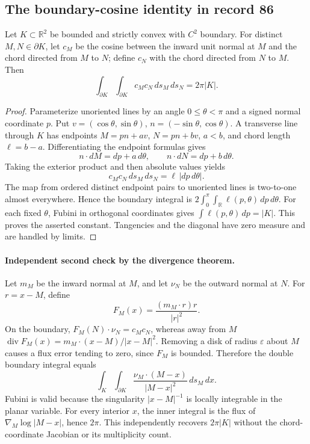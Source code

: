 \subsection{The boundary-cosine identity in record 86}

\begin{proposition}\ours
Let \(K\subset\mathbb R^2\) be bounded and strictly convex with \(C^2\)
boundary. For distinct \(M,N\in\partial K\), let \(c_M\) be the cosine between
the inward unit normal at \(M\) and the chord directed from \(M\) to \(N\);
define \(c_N\) with the chord directed from \(N\) to \(M\). Then
\[
 \int_{\partial K}\int_{\partial K}c_Mc_N\,ds_M\,ds_N=2\pi |K|.
\]
\end{proposition}

\begin{proof}
Parameterize unoriented lines by an angle \(0\leq\theta<\pi\) and a signed
normal coordinate \(p\). Put
\(v=(\cos\theta,\sin\theta)\), \(n=(-\sin\theta,\cos\theta)\).
A transverse line through \(K\) has endpoints
\(M=pn+av\), \(N=pn+bv\), \(a<b\), and chord length \(\ell=b-a\).
Differentiating the endpoint formulas gives
\[
 n\cdot dM=dp+a\,d\theta,\qquad n\cdot dN=dp+b\,d\theta.
\]
Taking the exterior product and then absolute values yields
\[
 c_Mc_N\,ds_M\,ds_N=\ell\,|dp\,d\theta|.
\]
The map from ordered distinct endpoint pairs to unoriented lines is
two-to-one almost everywhere. Hence the boundary integral is
\(2\int_0^\pi\int_{\mathbb R}\ell(p,\theta)\,dp\,d\theta\).
For each fixed \(\theta\), Fubini in orthogonal coordinates gives
\(\int\ell(p,\theta)\,dp=|K|\). This proves the asserted constant.
Tangencies and the diagonal have zero measure and are handled by limits.
\end{proof}

\paragraph{Independent second check by the divergence theorem.}\ours{}
Let \(m_M\) be the inward normal at \(M\), and let \(\nu_N\) be the
outward normal at \(N\). For \(r=x-M\), define
\[
 F_M(x)=\frac{(m_M\cdot r)r}{|r|^2}.
\]
On the boundary, \(F_M(N)\cdot\nu_N=c_Mc_N\), whereas away from \(M\)
\(\operatorname{div}F_M(x)=m_M\cdot(x-M)/|x-M|^2\).
Removing a disk of radius \(\varepsilon\) about \(M\) causes a flux
error tending to zero, since \(F_M\) is bounded. Therefore the double
boundary integral equals
\[
 \int_K\int_{\partial K}
 \frac{\nu_M\cdot(M-x)}{|M-x|^2}\,ds_M\,dx.
\]
Fubini is valid because the singularity \(|x-M|^{-1}\) is locally
integrable in the planar variable. For every interior \(x\), the inner
integral is the flux of \(\nabla_M\log|M-x|\), hence \(2\pi\).
This independently recovers \(2\pi|K|\) without the chord-coordinate
Jacobian or its multiplicity count.

